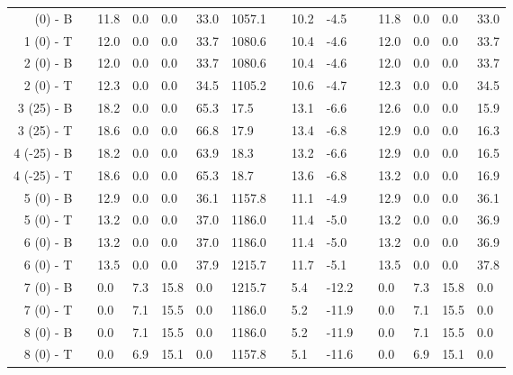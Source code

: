 \begin{table}[H]
\begin{longtable}{@{}rllllllllllllll@{}}
\bottomrule
\endlastfoot
   1 (0) - B &&    11.8 &     0.0 &     0.0 &    33.0 & 1057.1 && 10.2 &  -4.5 &&     11.8 &      0.0 &      0.0 &     33.0 \\
   1 (0) - T &&    12.0 &     0.0 &     0.0 &    33.7 & 1080.6 && 10.4 &  -4.6 &&     12.0 &      0.0 &      0.0 &     33.7 \\\midrule
   2 (0) - B &&    12.0 &     0.0 &     0.0 &    33.7 & 1080.6 && 10.4 &  -4.6 &&     12.0 &      0.0 &      0.0 &     33.7 \\
   2 (0) - T &&    12.3 &     0.0 &     0.0 &    34.5 & 1105.2 && 10.6 &  -4.7 &&     12.3 &      0.0 &      0.0 &     34.5 \\\midrule
  3 (25) - B &&    18.2 &     0.0 &     0.0 &    65.3 &   17.5 && 13.1 &  -6.6 &&     12.6 &      0.0 &      0.0 &     15.9 \\
  3 (25) - T &&    18.6 &     0.0 &     0.0 &    66.8 &   17.9 && 13.4 &  -6.8 &&     12.9 &      0.0 &      0.0 &     16.3 \\\midrule
 4 (-25) - B &&    18.2 &     0.0 &     0.0 &    63.9 &   18.3 && 13.2 &  -6.6 &&     12.9 &      0.0 &      0.0 &     16.5 \\
 4 (-25) - T &&    18.6 &     0.0 &     0.0 &    65.3 &   18.7 && 13.6 &  -6.8 &&     13.2 &      0.0 &      0.0 &     16.9 \\\midrule
   5 (0) - B &&    12.9 &     0.0 &     0.0 &    36.1 & 1157.8 && 11.1 &  -4.9 &&     12.9 &      0.0 &      0.0 &     36.1 \\
   5 (0) - T &&    13.2 &     0.0 &     0.0 &    37.0 & 1186.0 && 11.4 &  -5.0 &&     13.2 &      0.0 &      0.0 &     36.9 \\\midrule
   6 (0) - B &&    13.2 &     0.0 &     0.0 &    37.0 & 1186.0 && 11.4 &  -5.0 &&     13.2 &      0.0 &      0.0 &     36.9 \\
   6 (0) - T &&    13.5 &     0.0 &     0.0 &    37.9 & 1215.7 && 11.7 &  -5.1 &&     13.5 &      0.0 &      0.0 &     37.8 \\\midrule\midrule
   7 (0) - B &&     0.0 &     7.3 &    15.8 &     0.0 & 1215.7 &&  5.4 & -12.2 &&      0.0 &      7.3 &     15.8 &      0.0 \\
   7 (0) - T &&     0.0 &     7.1 &    15.5 &     0.0 & 1186.0 &&  5.2 & -11.9 & &     0.0 &      7.1 &     15.5 &      0.0 \\\midrule
   8 (0) - B &&     0.0 &     7.1 &    15.5 &     0.0 & 1186.0 &&  5.2 & -11.9 & &     0.0 &      7.1 &     15.5 &      0.0 \\
   8 (0) - T &&     0.0 &     6.9 &    15.1 &     0.0 & 1157.8 &&  5.1 & -11.6 & &     0.0 &      6.9 &     15.1 &      0.0 \\\midrule

\end{longtable}
\end{table}
